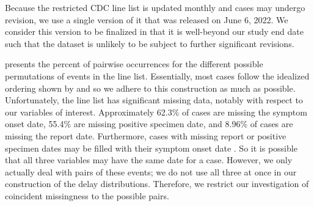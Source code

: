 Because the restricted CDC line list is updated monthly and cases may undergo revision, we
use a single version of it that was released on June 6, 2022. We consider this
version to be finalized in that it is well-beyond our study end date such that
the dataset is unlikely to be subject to further significant revisions.

 presents the percent of pairwise occurrences for
the different possible permutations of events in the line list. Essentially,
most cases follow the idealized ordering shown by
 and so we adhere to this construction as
much as possible. Unfortunately, the line list has significant missing data,
notably with respect to our variables of interest. Approximately 62.3\% of cases
are missing the symptom onset date, 55.4\% are missing positive specimen date,
and 8.96\% of cases are missing the report date. Furthermore, cases with missing
report or positive specimen dates may be filled with their symptom onset date
\citep{jahja2022real}. So it is possible that all three variables may have the
same date for a case. However, we only actually deal with pairs of these events;
we do not use all three at once in our construction of the delay distributions.
Therefore, we restrict our investigation of coincident missingness to the possible pairs.

